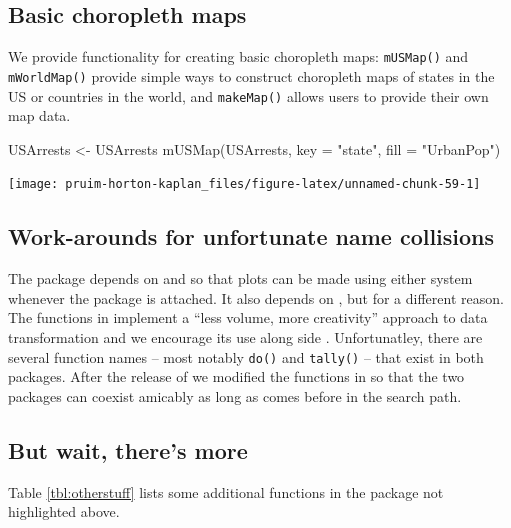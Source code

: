 \subsection{Basic choropleth maps}\label{basic-choropleth-maps}

We provide functionality for creating basic choropleth maps:
\texttt{mUSMap()} and \texttt{mWorldMap()} provide simple ways to
construct choropleth maps of states in the US or countries in the world,
and \texttt{makeMap()} allows users to provide their own map data.

\begin{Schunk}
\begin{Sinput}
USArrests <- USArrests %
mUSMap(USArrests, key = "state", fill = "UrbanPop")
\end{Sinput}


\begin{center}\texttt{[image: pruim-horton-kaplan\_files/figure-latex/unnamed-chunk-59-1]} \end{center}

\end{Schunk}

\subsection{Work-arounds for unfortunate name
collisions}\label{work-arounds-for-unfortunate-name-collisions}

The  package depends on  and  so
that plots can be made using either system whenever the 
package is attached. It also depends on  \citep{dplyr},
but for a different reason. The functions in  implement a
``less volume, more creativity'' approach to data transformation and we
encourage its use along side . Unfortunatley, there are
several function names -- most notably \texttt{do()} and
\texttt{tally()} -- that exist in both packages. After the release of
 we modified the functions in  so that the two
packages can coexist amicably as long as  comes before
 in the search path.

\subsection{But wait, there's more}\label{but-wait-theres-more}

Table \ref{tbl:otherstuff} lists some additional functions in the
 package not highlighted above.

